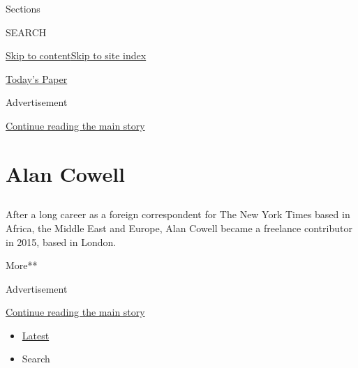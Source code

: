 Sections

SEARCH

\protect\hyperlink{site-content}{Skip to
content}\protect\hyperlink{site-index}{Skip to site index}

\href{https://myaccount.nytimes.com/auth/login?response_type=cookie\&client_id=vi}{}

\href{https://www.nytimes.com/section/todayspaper}{Today's Paper}

Advertisement

\protect\hyperlink{after-top}{Continue reading the main story}

\hypertarget{alan-cowell}{%
\section{Alan Cowell}\label{alan-cowell}}

\subsection{}

After a long career as a foreign correspondent for The New York Times
based in Africa, the Middle East and Europe, Alan Cowell became a
freelance contributor in 2015, based in London.

More**

Advertisement

\protect\hyperlink{after-mid1}{Continue reading the main story}

\begin{itemize}
\tightlist
\item
  \protect\hyperlink{stream-panel}{Latest}
\item
  Search
\end{itemize}

